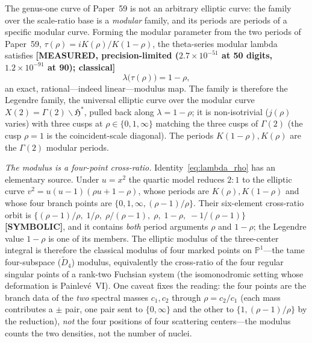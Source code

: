 \documentclass[aps,pra,twocolumn,superscriptaddress,longbibliography]{revtex4-2}
\begin{document}
The genus-one curve of Paper~59 is not an arbitrary elliptic curve:
the family over the scale-ratio base is a \emph{modular} family, and its periods
are periods of a specific modular curve.  Forming the modular parameter from the
two periods of Paper~59, $\tau(\rho)=iK(\rho)/K(1-\rho)$, the
theta-series modular lambda satisfies \textbf{[MEASURED, precision-limited
($2.7\times10^{-51}$ at 50 digits, $1.2\times10^{-91}$ at 90); classical]}
%
\begin{equation}
  \lambda\big(\tau(\rho)\big) = 1-\rho ,
  \label{eq:lambda_rho}
\end{equation}
%
an exact, rational---indeed linear---modulus map.  The family is therefore the
Legendre family, the universal elliptic curve over the modular curve
$X(2)=\Gamma(2)\backslash\mathfrak{H}^{\ast}$, pulled back along
$\lambda=1-\rho$; it is non-isotrivial ($j(\rho)$ varies) with three cusps at
$\rho\in\{0,1,\infty\}$ matching the three cusps of $\Gamma(2)$ (the cusp
$\rho=1$ is the coincident-scale diagonal).  The periods $K(1-\rho),K(\rho)$ are
the $\Gamma(2)$ modular periods.

\emph{The modulus is a four-point cross-ratio.}  Identity~\eqref{eq:lambda_rho}
has an elementary source.  Under $u=x^{2}$ the quartic model reduces $2\!:\!1$ to
the elliptic curve $v^{2}=u(u-1)(\rho u+1-\rho)$, whose periods are
$K(\rho),K(1-\rho)$ and whose four branch points are
$\{0,1,\infty,(\rho-1)/\rho\}$.  Their six-element cross-ratio orbit is
$\{(\rho-1)/\rho,\;1/\rho,\;\rho/(\rho-1),\;\rho,\;1-\rho,\;-1/(\rho-1)\}$
\textbf{[SYMBOLIC]}, and it contains \emph{both} period arguments $\rho$ and
$1-\rho$; the Legendre value $1-\rho$ is one of its members.  The elliptic
modulus of the three-center integral is therefore the classical modulus of four
marked points on $\mathbb{P}^{1}$---the tame four-subspace ($\tilde D_{4}$)
modulus, equivalently the cross-ratio of the four regular singular points of a
rank-two Fuchsian system (the isomonodromic setting whose deformation is
Painlev\'e~VI).  One caveat fixes the reading: the four points are the branch
data of the \emph{two} spectral masses $c_{1},c_{2}$ through $\rho=c_{2}/c_{1}$
(each mass contributes a $\pm$ pair, one pair sent to $\{0,\infty\}$ and the
other to $\{1,(\rho-1)/\rho\}$ by the reduction), \emph{not} the four positions
of four scattering centers---the modulus counts the two densities, not the
number of nuclei.
\end{document}
